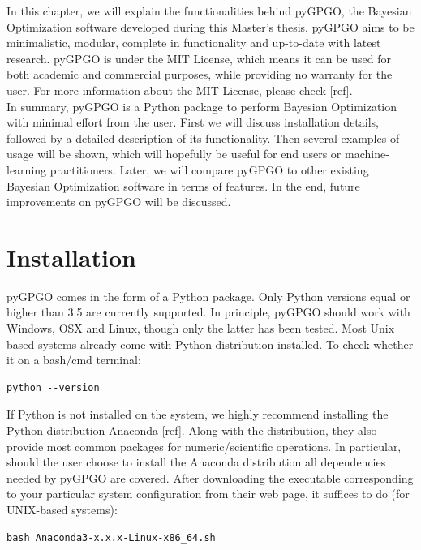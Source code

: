 \documentclass[10pt,a4paper,twoside]{book}
\begin{document}
In this chapter, we will explain the functionalities behind pyGPGO, the Bayesian Optimization software developed during this Master's thesis. pyGPGO aims to be minimalistic, modular, complete in functionality and up-to-date with latest research. pyGPGO is under the MIT License, which means it can be used for both academic and commercial purposes, while providing no warranty for the user. For more information about the MIT License, please check [ref].\\

In summary, pyGPGO is a Python package to perform Bayesian Optimization with minimal effort from the user. First we will discuss installation details, followed by a detailed description of its functionality. Then several examples of usage will be shown, which will hopefully be useful for end users or machine-learning practitioners. Later, we will compare pyGPGO to other existing Bayesian Optimization software in terms of features. In the end, future improvements on pyGPGO will be discussed.

\section{Installation}

pyGPGO comes in the form of a Python package. Only Python versions equal or higher than 3.5 are currently supported. In principle, pyGPGO should work with Windows, OSX and Linux, though only the latter has been tested. Most Unix based systems already come with Python distribution installed. To check whether it on a bash/cmd terminal:

\begin{verbatim}
python --version   
\end{verbatim}

If Python is not installed on the system, we highly recommend installing the Python distribution Anaconda [ref]. Along with the distribution, they also provide most common packages for numeric/scientific operations. In particular, should the user choose to install the Anaconda distribution all dependencies needed by pyGPGO are covered. After downloading the executable corresponding to your particular system configuration from their web page, it suffices to do (for UNIX-based systems):

\begin{verbatim}
bash Anaconda3-x.x.x-Linux-x86_64.sh
\end{verbatim}
\end{document}
